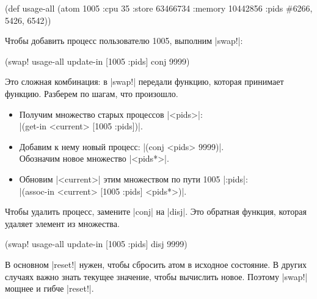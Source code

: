 \begin{english}
  \begin{clojure}
(def usage-all
  (atom {1005 {:cpu 35
               :store 63466734
               :memory 10442856
               :pids #{6266, 5426, 6542}}}))
  \end{clojure}
\end{english}

\noindent
Чтобы добавить процесс пользователю 1005, выполним \spverb|swap!|:

\begin{english}
  \begin{clojure}
(swap! usage-all update-in [1005 :pids] conj 9999)
  \end{clojure}
\end{english}

Это сложная комбинация: в \spverb|swap!| передали функцию, которая принимает
функцию. Разберем по шагам, что произошло.

\begin{itemize}

\item
  Получим множество старых процессов \spverb|<pids>|:\\
  \spverb|(get-in <current> [1005 :pids])|.

\item
  Добавим к нему новый процесс: \spverb|(conj <pids> 9999)|.\\
  Обозначим новое множество \spverb|<pids*>|.

\item
  Обновим \spverb|<current>| этим множеством по пути 1005 \arr{} \spverb|:pids|:\\
  \spverb|(assoc-in <current> [1005 :pids] <pids*>)|.

\end{itemize}

Чтобы удалить процесс, замените \spverb|conj| на \spverb|disj|. Это обратная
функция, которая удаляет элемент из множества.

\begin{english}
  \begin{clojure}
(swap! usage-all update-in [1005 :pids] disj 9999)
  \end{clojure}
\end{english}

В основном \spverb|reset!| нужен, чтобы сбросить атом в исходное состояние. В
других случаях важно знать текущее значение, чтобы вычислить новое. Поэтому
\spverb|swap!| мощнее и гибче \spverb|reset!|.

